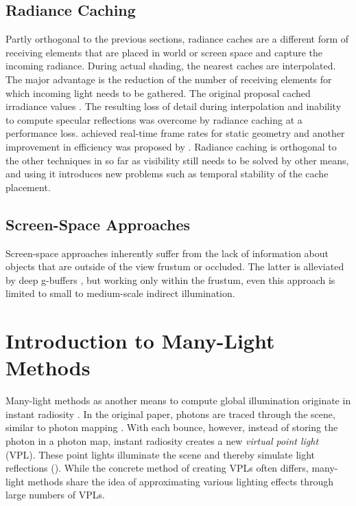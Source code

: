 \subsection{Radiance Caching}

Partly orthogonal to the previous sections, radiance caches are a different form of receiving elements that are placed in world or screen space and capture the incoming radiance. During actual shading, the nearest caches are interpolated. The major advantage is the reduction of the number of receiving elements for which incoming light needs to be gathered.
The original proposal cached irradiance values \citep{Ward:1988:IrradianceCaching}. The resulting loss of detail during interpolation and inability to compute specular reflections was overcome by radiance caching \citep{Krivanek:2005:RadianceCaching} at a performance loss. \citet{Scherzer:2012:PreconvolvedRadianceCaching} achieved real-time frame rates for static geometry and another improvement in efficiency was proposed by \citet{Rehfeld:2014:ClusteredPreconvolvedRadianceCaching}.
Radiance caching is orthogonal to the other techniques in so far as visibility still needs to be solved by other means, and using it introduces new problems such as temporal stability of the cache placement.


\subsection{Screen-Space Approaches}

Screen-space approaches inherently suffer from the lack of information about objects that are outside of the view frustum or occluded. The latter is alleviated by deep g-buffers \citep{Mara:2014:DeepGBuffers, Mara:2016:DeepGBuffers2}, but working only within the frustum, even this approach is limited to small to medium-scale indirect illumination.



\section{Introduction to Many-Light Methods}


Many-light methods as another means to compute global illumination originate in instant radiosity \citep{Keller:1997:InstantRadiosity}. In the original paper, photons are traced through the scene, similar to photon mapping \citep{Jensen:1996:PhotonMapping}. With each bounce, however, instead of storing the photon in a photon map, instant radiosity creates a new \emph{virtual point light} (VPL). These point lights illuminate the scene and thereby simulate light reflections (). While the concrete method of creating VPLs often differs, many-light methods share the idea of approximating various lighting effects through large numbers of VPLs.

